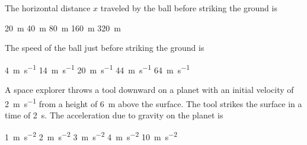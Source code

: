 \documentclass{../../../oss-ap12ibhl}
\begin{document}
\begin{questions}
  \question The horizontal distance $x$ traveled by the ball before striking the
  ground is

  \begin{oneparchoices}
    \choice\SI{20}{\metre}\hspace{.4in}
    \choice\SI{40}{\metre}\hspace{.4in}
    \choice\SI{80}{\metre}\hspace{.4in} 
    \choice\SI{160}{\metre}\hspace{.4in}
    \choice\SI{320}{\metre}
  \end{oneparchoices}
  \vspace{.3in}

  \question The speed of the ball just before striking the ground is

  \begin{oneparchoices}
    \choice\SI{4}{\metre\per\second}\hspace{.3in}
    \choice\SI{14}{\metre\per\second}\hspace{.3in}
    \choice\SI{20}{\metre\per\second}\hspace{.3in}
    \choice\SI{44}{\metre\per\second}\hspace{.3in}
    \choice\SI{64}{\metre\per\second}
  \end{oneparchoices}
  \vspace{.3in}
  
  \uplevel{\rule{\linewidth}{.6pt}}

  \question A space explorer throws a tool downward on a planet with an initial
  velocity of \SI{2}{\metre\per\second} from a height of \SI{6}{\metre}
  above the surface. The tool strikes the surface in a time of \SI{2}{\second}.
  The acceleration due to gravity on the planet is

  \begin{oneparchoices}
    \choice\SI{1}{\metre\per\second\squared}\hspace{.27in}
    \choice\SI{2}{\metre\per\second\squared}\hspace{.27in}
    \choice\SI{3}{\metre\per\second\squared}\hspace{.27in}
    \choice\SI{4}{\metre\per\second\squared}\hspace{.27in}
    \choice\SI{10}{\metre\per\second\squared}
  \end{oneparchoices}
  \vspace{.3in}
  
  \uplevel{\rule{\linewidth}{.6pt}}


\end{questions}
\end{document}

